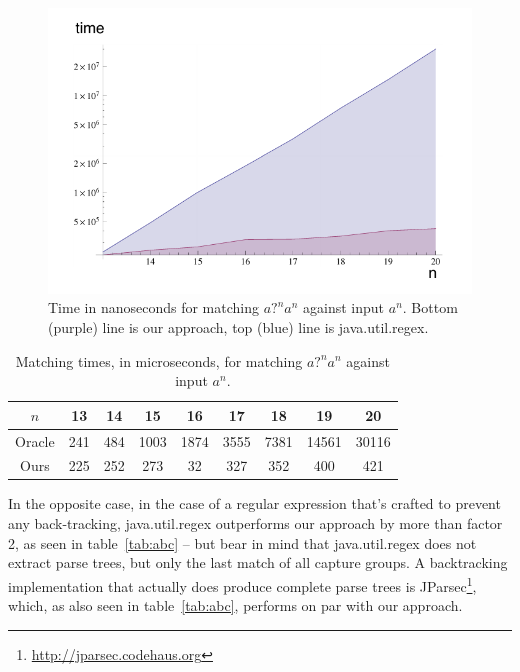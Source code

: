\documentclass[english,twocolumn]{article}
\theoremstyle{definition}
\newcommand{\Tabref}[1]{table~\ref{tab:#1}}
\newcommand{\figlabel}[1]{\label{fig:#1}}
\newcommand{\tablabel}[1]{\label{tab:#1}}
\begin{document}
\begin{figure}[htp]
\includegraphics[width=\linewidth]{graphs/pathological-with-axes.pdf}
\caption{Time in nanoseconds for matching $\textit{a?}^n\textit{a}^n$ against input $\textit{a}^n$. Bottom (purple) line is our approach, top (blue) line is java.util.regex.}
\figlabel{patho}
\end{figure}

\begin{table}[htb]\center
\begin{tabular}{ccccccccc}
\toprule
$n$ & 13 & 14 & 15 & 16 & 17 & 18 & 19 & 20\tabularnewline
\midrule
Oracle & 241 & 484 & 1003 & 1874 & 3555 & 7381 & 14561 & 30116\tabularnewline
Ours & 225 & 252 & 273 & 32 & 327 & 352 & 400 & 421\tabularnewline
\bottomrule
\end{tabular}
\caption{Matching times, in microseconds, for matching $\textit{a?}^n\textit{a}^n$ against input $\textit{a}^n$.}
\tablabel{patho}
\end{table}

In the opposite case, in the case of a regular expression that's
crafted to prevent any back-tracking, java.util.regex outperforms
our approach by more than factor 2, as seen in \Tabref{abc} -- but
bear in mind that java.util.regex does not extract parse trees, but
only the last match of all capture groups.  A backtracking
implementation that actually does produce complete parse trees is
JParsec\footnote{\url{http://jparsec.codehaus.org}}, which, as also
seen in \Tabref{abc}, performs on par with our approach. 

\end{document}
